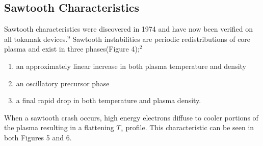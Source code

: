 \documentclass{article}
\begin{document}
\subsection{Sawtooth Characteristics}
Sawtooth characteristics were discovered in 1974 and have now been verified on all tokamak devices.$^{9}$  Sawtooth instabilities are periodic redistributions of core plasma and exist in three phases(Figure 4);$^{2}$
\begin{enumerate}
\item an approximately linear increase in both plasma temperature and density
\item an oscillatory precursor phase
\item a final rapid drop in both temperature and plasma density.
\end{enumerate}
\begin{SCfigure}
\centering
{}
\end{SCfigure}
When a sawtooth crash occurs, high energy electrons diffuse to cooler portions of the plasma resulting in a flattening $T_e$ profile.  This characteristic can be seen in both Figures 5 and 6.
\begin{SCfigure}
\centering
{}
\end{SCfigure}
\begin{SCfigure}
\centering
{}
\end{SCfigure}
\end{document}
